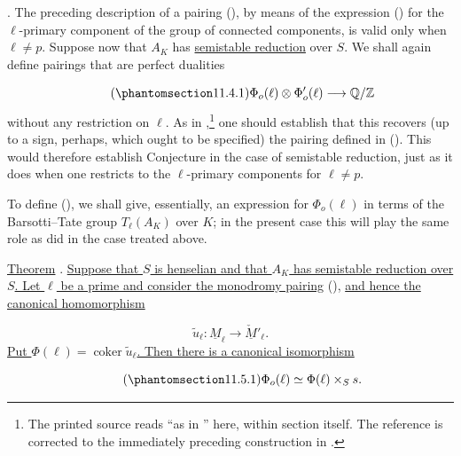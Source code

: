 
\medskip
\noindent
{}. The preceding description of a pairing (), by means of the
expression () for the $\ell$-primary component of the group of
connected components, is valid only when $\ell\ne p$. Suppose now that
$A_K$ has \underline{semistable reduction} over $S$. We shall again
define pairings that are perfect dualities

\begin{equation}\tag{\SGARefTarget{sga7.sga7i.eix.n11-4-1}{11.4.1}}
\Phi_o(\ell)\otimes\Phi'_o(\ell)\longrightarrow\mathbb Q/\mathbb Z
\end{equation}
without any restriction on $\ell$. As in ,\footnote{The printed
source reads ``as in '' here, within section  itself. The
reference is corrected to the immediately preceding construction in
.} one should establish that this recovers (up to a sign, perhaps,
which ought to be specified) the pairing defined in (). This would
therefore establish Conjecture  in the case of semistable reduction,
just as it does when one restricts to the $\ell$-primary components for
$\ell\ne p$.

To define (), we shall give, essentially, an expression for
$\Phi_o(\ell)$ in terms of the Barsotti--Tate group $T_\ell(A_K)$ over
$K$; in the present case this will play the same role as  did in
the case treated above.

\medskip
\noindent
\underline{Theorem} . \underline{Suppose that $S$ is henselian and
that $A_K$ has semistable reduction over $S$. Let $\ell$ be a prime and
consider the monodromy pairing} (), \underline{and hence the
canonical homomorphism}

\begin{equation*}
\widetilde u_\ell:\underline M_\ell
 \longrightarrow\underline{\check M}'_\ell.
\end{equation*}
\underline{Put $\Phi(\ell)=\operatorname{coker}\widetilde u_\ell$.
Then there is a canonical isomorphism}

\begin{equation}\tag{\SGARefTarget{sga7.sga7i.eix.n11-5-1}{11.5.1}}
\Phi_o(\ell)\simeq\Phi(\ell)\times_S s.
\end{equation}


